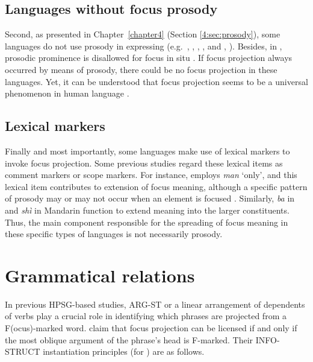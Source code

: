 \subsection{Languages without focus prosody}
\label{8:ssec:no-prosodic}


Second, as presented in Chapter~\ref{chapter4}
(Section \ref{4:sec:prosody}), some languages do not use prosody
in expressing  (e.g.\ ,
\citealt{kugler:etal:07}, , \citealt{drubig:03}, and
, \citealt{engdahl:vallduvi:96}).  Besides, in
, prosodic prominence is disallowed for focus in situ
\citep{hartmann:zimmermann:07,buring:10} . If focus projection always occurred by means of prosody,
there could be no focus projection in these languages. Yet, it can be
understood that focus projection seems to be a universal phenomenon in
human language \citep{buring:06}.




\subsection{Lexical markers}
\label{8:ssec:comment-scope}

Finally and most importantly, some languages make use of lexical
markers to invoke focus projection. Some previous
studies regard these lexical items as comment markers or scope
markers.  For instance,  employs \textit{man} `only', and
this lexical item contributes to extension of focus
meaning, although a specific pattern of prosody may or may
not occur when an element is focused \citep{choe:02}.  Similarly,
\textit{ba} in  \citep{schneider:09} and \textit{sh\`{i}} in
Mandarin  \citep{prince:12} function to extend 
meaning into the larger constituents.  Thus, the main component
responsible for the spreading of focus meaning in these specific types
of languages is not necessarily prosody.



\section{Grammatical relations}
\label{10-4:sec:grammatical}

In previous HPSG-based studies, ARG-ST or a linear
arrangement of dependents of verbs play a crucial role in identifying
which phrases are projected from a F(ocus)-marked word. \citet{engdahl:vallduvi:96} claim that focus projection
can be licensed if and only if the most oblique argument of the
phrase's head is F-marked. Their INFO-STRUCT instantiation principles
(for ) are as follows.


